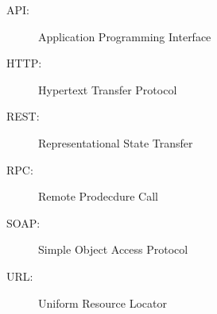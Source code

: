 \label{sec:abkuerzungsverzeichnis}

\begin{description}
  	\item[API:] Application Programming Interface
	\item[HTTP:] Hypertext Transfer Protocol
	\item[REST:] Representational State Transfer
	\item[RPC:]Remote Prodecdure Call
	\item[SOAP:]Simple Object Access Protocol
	\item[URL:] Uniform Resource Locator
\end{description}


